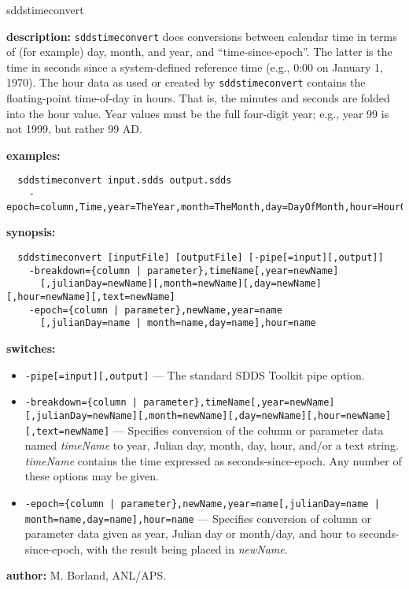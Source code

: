 \begin{sddsprog}{sddstimeconvert}
  \item \textbf{description:}
  \verb|sddstimeconvert| does conversions between calendar time in terms of (for example) day, month, and year, and ``time-since-epoch''. The latter is the time in seconds since a system-defined reference time (e.g., 0:00 on January 1, 1970). The hour data as used or created by \verb|sddstimeconvert| contains the floating-point time-of-day in hours. That is, the minutes and seconds are folded into the hour value. Year values must be the full four-digit year; e.g., year 99 is not 1999, but rather 99 AD.

  \item \textbf{examples:}
  \begin{verbatim}
  sddstimeconvert input.sdds output.sdds
    -epoch=column,Time,year=TheYear,month=TheMonth,day=DayOfMonth,hour=HourOfDay
  \end{verbatim}

  \item \textbf{synopsis:}
  \begin{verbatim}
  sddstimeconvert [inputFile] [outputFile] [-pipe[=input][,output]]
    -breakdown={column | parameter},timeName[,year=newName]
      [,julianDay=newName][,month=newName][,day=newName][,hour=newName][,text=newName]
    -epoch={column | parameter},newName,year=name
      [,julianDay=name | month=name,day=name],hour=name
  \end{verbatim}

  \item \textbf{switches:}
  \begin{itemize}
    \item \verb|-pipe[=input][,output]| --- The standard SDDS Toolkit pipe option.
    \item \verb!-breakdown={column | parameter},timeName[,year=newName][,julianDay=newName][,month=newName][,day=newName][,hour=newName][,text=newName]! --- Specifies conversion of the column or parameter data named \emph{timeName} to year, Julian day, month, day, hour, and/or a text string. \emph{timeName} contains the time expressed as seconds-since-epoch. Any number of these options may be given.
    \item \verb!-epoch={column | parameter},newName,year=name[,julianDay=name | month=name,day=name],hour=name! --- Specifies conversion of column or parameter data given as year, Julian day or month/day, and hour to seconds-since-epoch, with the result being placed in \emph{newName}.
  \end{itemize}

  \item \textbf{author:} M. Borland, ANL/APS.
\end{sddsprog}

